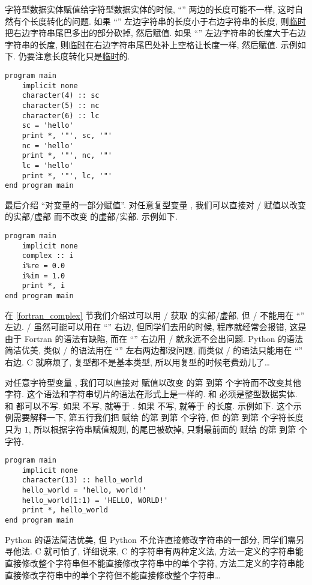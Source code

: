 字符型数据实体赋值给字符型数据实体的时候, ``\ttt{=}'' 两边的长度可能不一样, 这时自然有个长度转化的问题. 如果 ``\ttt{=}'' 左边字符串的长度小于右边字符串的长度, 则\uline{临时}把右边字符串尾巴多出的部分砍掉, 然后赋值. 如果 ``\ttt{=}'' 左边字符串的长度大于右边字符串的长度, 则\uline{临时}在右边字符串尾巴处补上空格让长度一样, 然后赋值. 示例如下. 仍要注意长度转化只是\uline{临时}的.
\begin{lstlisting}
program main
    implicit none
    character(4) :: sc
    character(5) :: nc
    character(6) :: lc
    sc = 'hello'
    print *, '"', sc, '"'
    nc = 'hello'
    print *, '"', nc, '"'
    lc = 'hello'
    print *, '"', lc, '"'
end program main
\end{lstlisting}

最后介绍 ``对变量的一部分赋值''. 对任意复型变量 \ttt{[z]}, 我们可以直接对 / 赋值以改变 \ttt{[z]} 的实部/虚部 而不改变 \ttt{[z]} 的虚部/实部. 示例如下.
\begin{lstlisting}
program main
    implicit none
    complex :: i
    i%re = 0.0
    i%im = 1.0
    print *, i
end program main
\end{lstlisting}
在 \ref{fortran_complex} 节我们介绍过可以用 / 获取 \ttt{[z]} 的实部/虚部, 但 / 不能用在 ``\ttt{=}'' 左边. / 虽然可能可以用在 ``\ttt{=}'' 右边, 但同学们去用的时候, 程序就经常会报错, 这是由于 Fortran 的语法有缺陷, 而在 ``\ttt{=}'' 右边用 / 就永远不会出问题. Python 的语法简洁优美, 类似 / 的语法用在 ``\ttt{=}'' 左右两边都没问题, 而类似 / 的语法只能用在 ``\ttt{=}'' 右边. C 就麻烦了, 复型都不是基本类型, 所以用复型的时候老费劲儿了\dots{}

对任意字符型变量 \ttt{[c]}, 我们可以直接对  赋值以改变 \ttt{[c]} 的第  到第  个字符而不改变其他字符. 这个语法和字符串切片的语法在形式上是一样的.  和  必须是整型数据实体.  和  都可以不写. 如果  不写,  就等于 . 如果  不写,  就等于 \ttt{[c]} 的长度. 示例如下. 这个示例需要解释一下, 第五行我们把  赋给  的第  到第  个字符, 但  的第  到第  个字符长度只为 $1$, 所以根据字符串赋值规则,  的尾巴被砍掉, 只剩最前面的  赋给 的第  到第  个字符.
\begin{lstlisting}
program main
    implicit none
    character(13) :: hello_world
    hello_world = 'hello, world!'
    hello_world(1:1) = 'HELLO, WORLD!'
    print *, hello_world
end program main
\end{lstlisting}
Python 的语法简洁优美, 但 Python 不允许直接修改字符串的一部分, 同学们需另寻他法. C 就可怕了, 详细说来, C 的字符串有两种定义法, 方法一定义的字符串能直接修改整个字符串但不能直接修改字符串中的单个字符, 方法二定义的字符串能直接修改字符串中的单个字符但不能直接修改整个字符串\dots{}


